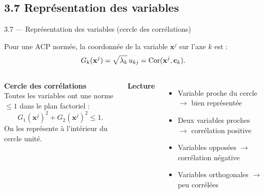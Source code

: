 \subsection{3.7 Représentation des variables}
\begin{frame}{3.7 — Représentation des variables (cercle des corrélations)}
\begin{theorem}
Pour une ACP normée, la coordonnée de la variable $\mathbf{x}^j$ sur
l'axe $k$ est :
\[
G_k(\mathbf{x}^j) = \sqrt{\lambda_k}\, u_{kj} = \operatorname{Cor}(\mathbf{x}^j, \mathbf{c}_k).
\]
\end{theorem}

\begin{columns}[T]
\textbf{Cercle des corrélations}\\
\small Toutes les variables ont une norme $\leq 1$ dans le plan factoriel :
\[
G_1(\mathbf{x}^j)^2 + G_2(\mathbf{x}^j)^2 \leq 1.
\]
On les représente \alert{à l'intérieur du cercle unité}.

\textbf{Lecture}
\begin{itemize}\small
  \item Variable proche du cercle $\to$ bien représentée
  \item Deux variables proches $\to$ corrélation positive
  \item Variables opposées $\to$ corrélation négative
  \item Variables orthogonales $\to$ peu corrélées
\end{itemize}
\end{columns}
\end{frame}

